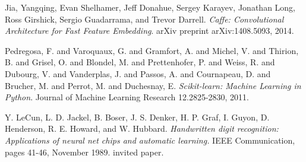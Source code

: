 \documentclass[leqno]{article}
\begin{document}
\begin{thebibliography}{9}
Jia, Yangqing, Evan Shelhamer, Jeff Donahue, Sergey Karayev, Jonathan Long, Ross Girshick, Sergio Guadarrama, and Trevor Darrell.
\textit{Caffe: Convolutional Architecture for Fast Feature Embedding}.
arXiv preprint arXiv:1408.5093, 2014.


Pedregosa, F. and Varoquaux, G. and Gramfort, A. and Michel, V.
         and Thirion, B. and Grisel, O. and Blondel, M. and Prettenhofer, P.
         and Weiss, R. and Dubourg, V. and Vanderplas, J. and Passos, A. and
         Cournapeau, D. and Brucher, M. and Perrot, M. and Duchesnay, E.
         \textit{Scikit-learn: Machine Learning in Python}. Journal of Machine
         Learning Research 12.2825-2830, 2011.

   Y. LeCun, L. D. Jackel, B. Boser, J. S. Denker, H. P. Graf, I. Guyon, D.
   Henderson, R. E. Howard, and W. Hubbard. \textit{Handwritten digit
   recognition: Applications of neural net chips and automatic learning.} IEEE Communication, pages 41-46, November 1989. invited paper.
\end{thebibliography}
\end{document}
